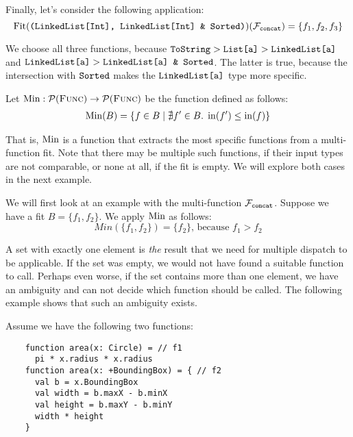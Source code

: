 \medskip
	
\noindent Finally, let's consider the following application:
\begin{equation*}
	\operatorname{Fit}(\texttt{(LinkedList[Int], LinkedList[Int] \& Sorted)})(\mathcal{F}_{\text{\texttt{concat}}}) = \{ f_1, f_2, f_3 \}
\end{equation*}
	
\noindent We choose all three functions, because $\texttt{ToString} > \texttt{List[a]} > \texttt{LinkedList[a]}$ and $ \texttt{LinkedList[a]} > \texttt{LinkedList[a] \& Sorted}$. The latter is true, because the intersection with $\texttt{Sorted}$ makes the $\texttt{LinkedList[a]}$ type more specific.


\begin{definition} \label{def:mfmin}
	Let $\operatorname{Min} : \mathcal{P}(\textsc{Func}) \rightarrow \mathcal{P}(\textsc{Func})$ be the function defined as follows:
	\begin{align*}
		\operatorname{Min}(B) = \{ f \in B \mid \nexists f' \in B.\; \operatorname{in}(f') \leq \operatorname{in}(f) \}
	\end{align*}
\end{definition}

\noindent That is, $\operatorname{Min}$ is a function that extracts the most specific functions from a multi-function fit. Note that there may be multiple such functions, if their input types are not comparable, or none at all, if the fit is empty. We will explore both cases in the next example.

We will first look at an example with the multi-function $\mathcal{F}_{\text{\texttt{concat}}}$. Suppose we have a fit $B = \{ f_1, f_2 \}$. We apply $\operatorname{Min}$ as follows:
\begin{equation*}
	Min(\{ f_1, f_2 \}) = \{ f_2 \} \text{, because } f_1 > f_2
\end{equation*}
	
\noindent A set with exactly one element is \textit{the} result that we need for multiple dispatch to be applicable. If the set was empty, we would not have found a suitable function to call. Perhaps even worse, if the set contains more than one element, we have an ambiguity and can not decide which function should be called. The following example shows that such an ambiguity exists.

\medskip
	
\noindent Assume we have the following two functions:
\begin{lstlisting}
    function area(x: Circle) = // f1
      pi * x.radius * x.radius 
    function area(x: +BoundingBox) = { // f2
      val b = x.BoundingBox
      val width = b.maxX - b.minX
      val height = b.maxY - b.minY
      width * height
    } 
\end{lstlisting}
	
